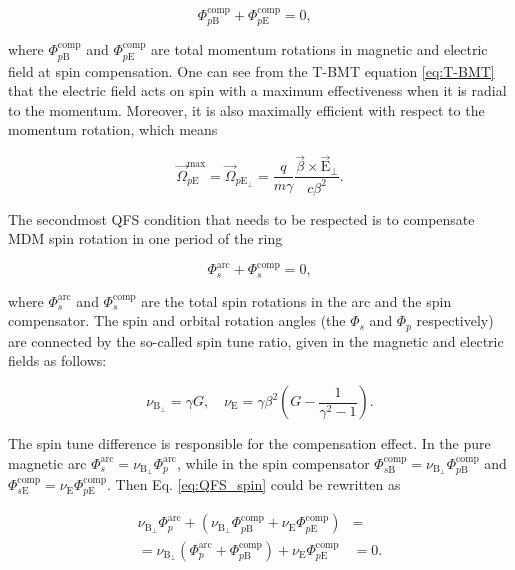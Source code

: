 \documentclass[submitting]{nst}
\begin{document}
\begin{equation}
	\Phi_{p\textrm{B}}^{\textrm{comp}}+{\Phi}_{p\textrm{E}}^{\textrm{comp}} = 0,\ \ \ 
\end{equation}

\noindent where $\Phi_{p\textrm{B}}^{\textrm{comp}}$ and ${\Phi}_{p\textrm{E}}^{\textrm{comp}}$ are total momentum rotations in magnetic and electric field at spin compensation. One can see from the T-BMT equation \ref{eq:T-BMT} that the electric field acts on spin with a maximum effectiveness when it is radial to the momentum. Moreover, it is also maximally efficient with respect to the momentum rotation, which means

\begin{equation}
	\vec{\Omega}_{p\mathrm{E}}^{\text{max}} = \vec{\Omega}_{p\mathrm{E}_{\perp}}=\frac{q}{m \gamma} \frac{\vec{\beta} \times \vec{\mathrm{E}}_{\perp}}{c \beta^2}.
\end{equation}

\par The secondmost QFS condition that needs to be respected is to compensate MDM spin rotation in one period of the ring 

\begin{equation}
	\Phi_s^{\textrm{arc}}+\Phi_{s}^{\textrm{comp}}=0,
	\label{eq:QFS_spin}
\end{equation}

\noindent where $\Phi_s^{\textrm{arc}}$ and $\Phi_{s}^{\textrm{comp}}$ are the total spin rotations in the arc and the spin compensator. The spin and orbital rotation angles (the $\Phi_{s}$ and $\Phi_{p}$ respectively) are connected by the so-called spin tune ratio, given in the magnetic and electric fields as follows:

\begin{equation}
	\nu_{\mathrm{B}_{\perp}} = \gamma G, \quad \nu_{\mathrm{E}} = \gamma \beta^2 \left(G-\frac{1}{\gamma^{2}-1}\right).
	\label{eq:spin-tine}
\end{equation} 

 \noindent The spin tune difference is responsible for the compensation effect. In the pure magnetic arc $\Phi_{s}^{\text{arc}} = \nu_{\mathrm{B}_{\perp}}\Phi_{p}^{\text{arc}}$, while in the spin compensator $\Phi_{s\mathrm{B}}^{\text{comp}} = \nu_{\mathrm{B}_{\perp}}\Phi_{p\mathrm{B}}^{\text{comp}}$ and $\Phi_{s\mathrm{E}}^{\text{comp}} = \nu_{\mathrm{E}}\Phi_{p\mathrm{E}}^{\text{comp}}$. Then Eq. \ref{eq:QFS_spin} could be rewritten as
 
 \begin{equation}
 	\begin{aligned}
 	\nu_{\mathrm{B}_{\perp}}\Phi_{p}^{\text{arc}} +
 	\left(\nu_{\mathrm{B}_{\perp}}\Phi_{p\mathrm{B}}^{\text{comp}} +
 	\nu_{\mathrm{E}}\Phi_{p\mathrm{E}}^{\text{comp}} \right) & = \\
 	= \nu_{\mathrm{B}_{\perp}} \left( 
 	\Phi_{p}^{\text{arc}} +
 	\Phi_{p\mathrm{B}}^{\text{comp}} \right) +
 	\nu_{\mathrm{E}}\Phi_{p\mathrm{E}}^{\text{comp}}  & = 0.
 	\label{eq:deflection}
 	\end{aligned}
 \end{equation}
  
\end{document}

